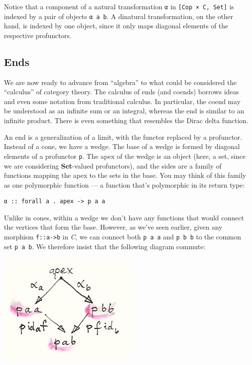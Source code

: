 Notice that a component of a natural transformation \texttt{α} in
\texttt{{[}Cop\ ×\ C,\ Set{]}} is indexed by a pair of objects
\texttt{α\ a\ b}. A dinatural transformation, on the other hand, is
indexed by one object, since it only maps diagonal elements of the
respective profunctors.

\subsection{Ends}\label{ends}

We are now ready to advance from ``algebra'' to what could be considered
the ``calculus'' of category theory. The calculus of ends (and coends)
borrows ideas and even some notation from traditional calculus. In
particular, the coend may be understood as an infinite sum or an
integral, whereas the end is similar to an infinite product. There is
even something that resembles the Dirac delta function.

An end is a generalization of a limit, with the functor replaced by a
profunctor. Instead of a cone, we have a wedge. The base of a wedge is
formed by diagonal elements of a profunctor \texttt{p}. The apex of the
wedge is an object (here, a set, since we are considering
\textbf{Set}-valued profunctors), and the sides are a family of
functions mapping the apex to the sets in the base. You may think of
this family as one polymorphic function --- a function that's
polymorphic in its return type:

\begin{verbatim}
α :: forall a . apex -> p a a
\end{verbatim}

Unlike in cones, within a wedge we don't have any functions that would
connect the vertices that form the base. However, as we've seen earlier,
given any morphism \texttt{f::a-\textgreater{}b} in \emph{C}, we can
connect both \texttt{p\ a\ a} and \texttt{p\ b\ b} to the common set
\texttt{p\ a\ b}. We therefore insist that the following diagram
commute:

\includegraphics[width=2.69792in]{images/end-2.jpg}

